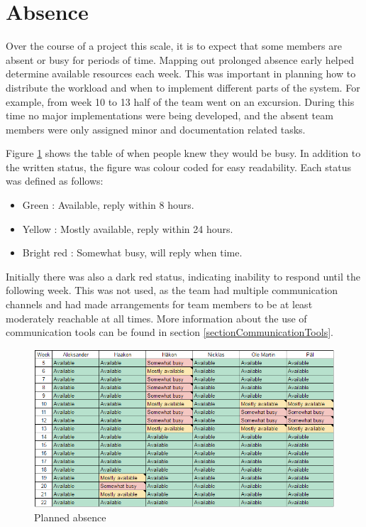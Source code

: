 \section{Absence}
Over the course of a project this scale, it is to expect that some members are absent or busy for periods of time. Mapping out prolonged absence early helped determine available resources each week. This was important in planning how to distribute the workload and when to implement different parts of the system. 
For example, from week 10 to 13 half of the team went on an excursion. During this time no major implementations were being developed, and the absent team members were only assigned minor and documentation related tasks. 

Figure \ref{plannedAbsence} shows the table of when people knew they would be busy. In addition to the written status, the figure was colour coded for easy readability. Each status was defined as follows:
\begin{flushleft}
\begin{itemize}
\itemsep -0.5em
    \item Green : Available, reply within 8 hours.
    \item Yellow : Mostly available, reply within 24 hours.
    \item Bright red : Somewhat busy, will reply when time.
\end{itemize}
\end{flushleft}

\noindent Initially there was also a dark red status, indicating inability to respond until the following week. This was not used, as the team had multiple communication channels and had made arrangements for team members to be at least moderately reachable at all times. More information about the use of communication tools can be found in section \ref{sectionCommunicationTools}.

\begin{figure}[H]
    \includegraphics[width=\textwidth]{tables/planning/whereAreYou}
    \caption{Planned absence}
    \label{plannedAbsence}
\end{figure}


